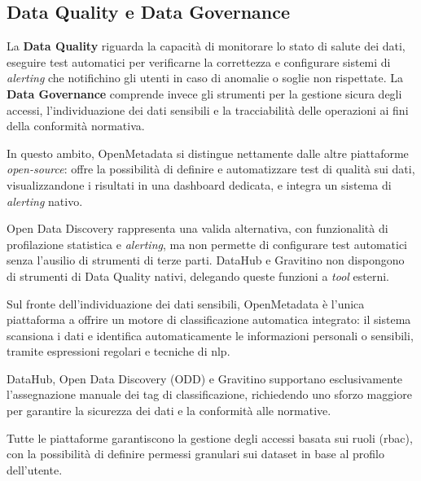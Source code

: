 \subsection{Data Quality e Data Governance}
La \textbf{Data Quality} riguarda la capacità di monitorare lo stato di salute dei dati, eseguire test automatici per verificarne la correttezza e configurare sistemi 
di \emph{alerting} che notifichino gli utenti in caso di anomalie o soglie non rispettate. La \textbf{Data Governance} comprende invece gli strumenti per la gestione sicura degli accessi, 
l'individuazione dei dati sensibili e la tracciabilità delle operazioni ai fini della conformità normativa.

In questo ambito, OpenMetadata si distingue nettamente dalle altre piattaforme \emph{open-source}: offre la possibilità di definire e automatizzare test di qualità sui dati, 
visualizzandone i risultati in una dashboard dedicata, e integra un sistema di \emph{alerting} nativo.

Open Data Discovery rappresenta una valida alternativa, con funzionalità di profilazione statistica e \emph{alerting}, ma non permette di configurare test automatici senza l'ausilio di strumenti di terze parti.  
DataHub e Gravitino non dispongono di strumenti di Data Quality nativi, delegando queste funzioni a \emph{tool} esterni.

Sul fronte dell'individuazione dei dati sensibili, OpenMetadata è l'unica piattaforma a offrire un motore di classificazione automatica integrato: il sistema scansiona i dati e identifica automaticamente 
le informazioni personali o sensibili, tramite espressioni regolari e tecniche di \gls{nlp}.

DataHub, Open Data Discovery (ODD) e Gravitino supportano esclusivamente l'assegnazione manuale dei tag di classificazione, richiedendo uno sforzo maggiore per 
garantire la sicurezza dei dati e la conformità alle normative.

Tutte le piattaforme garantiscono la gestione degli accessi basata sui ruoli (\gls{rbac}), con la possibilità di definire permessi granulari sui dataset in base al profilo dell'utente.

